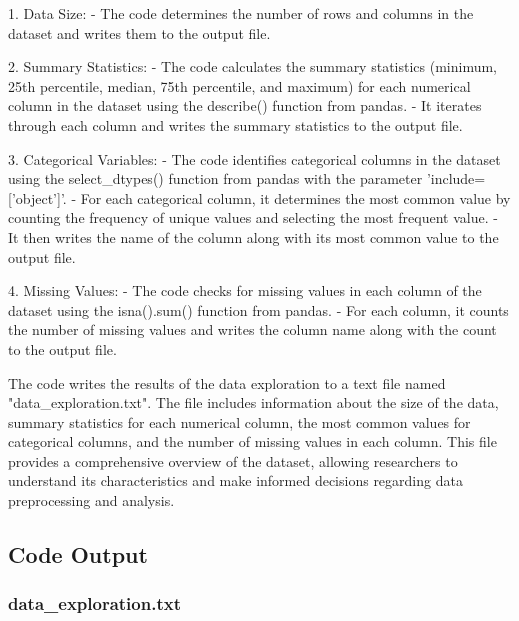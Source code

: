\documentclass[11pt]{article}
\begin{document}
1. Data Size:
   - The code determines the number of rows and columns in the dataset and writes them to the output file.

2. Summary Statistics:
   - The code calculates the summary statistics (minimum, 25th percentile, median, 75th percentile, and maximum) for each numerical column in the dataset using the describe() function from pandas.
   - It iterates through each column and writes the summary statistics to the output file.

3. Categorical Variables:
   - The code identifies categorical columns in the dataset using the select\_dtypes() function from pandas with the parameter 'include=['object']'.
   - For each categorical column, it determines the most common value by counting the frequency of unique values and selecting the most frequent value.
   - It then writes the name of the column along with its most common value to the output file.

4. Missing Values:
   - The code checks for missing values in each column of the dataset using the isna().sum() function from pandas.
   - For each column, it counts the number of missing values and writes the column name along with the count to the output file.

The code writes the results of the data exploration to a text file named "data\_exploration.txt". The file includes information about the size of the data, summary statistics for each numerical column, the most common values for categorical columns, and the number of missing values in each column. This file provides a comprehensive overview of the dataset, allowing researchers to understand its characteristics and make informed decisions regarding data preprocessing and analysis.

\subsection{Code Output}

\subsubsection*{data\_exploration.txt}
\end{document}
